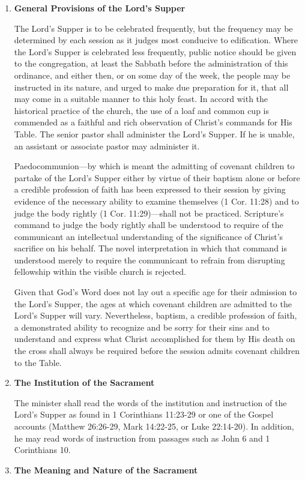 \documentclass[
]{book}
\begin{document}
\begin{enumerate}
\def\labelenumi{\arabic{enumi}.}
\item
  \protect\hypertarget{61}{\href{}{}}\textbf{General Provisions of the Lord's Supper}

  The Lord's Supper is to be celebrated frequently, but the frequency may be determined by each session as it judges most conducive to edification. Where the Lord's Supper is celebrated less frequently, public notice should be given to the congregation, at least the Sabbath before the administration of this ordinance, and either then, or on some day of the week, the people may be instructed in its nature, and urged to make due preparation for it, that all may come in a suitable manner to this holy feast. In accord with the historical practice of the church, the use of a loaf and common cup is commended as a faithful and rich observation of Christ's commands for His Table. The senior pastor shall administer the Lord's Supper. If he is unable, an assistant or associate pastor may administer it.

  Paedocommunion---by which is meant the admitting of covenant children to partake of the Lord's Supper either by virtue of their baptism alone or before a credible profession of faith has been expressed to their session by giving evidence of the necessary ability to examine themselves (1 Cor. 11:28) and to judge the body rightly (1 Cor. 11:29)---shall not be practiced. Scripture's command to judge the body rightly shall be understood to require of the communicant an intellectual understanding of the significance of Christ's sacrifice on his behalf. The novel interpretation in which that command is understood merely to require the communicant to refrain from disrupting fellowship within the visible church is rejected.

  Given that God's Word does not lay out a specific age for their admission to the Lord's Supper, the ages at which covenant children are admitted to the Lord's Supper will vary. Nevertheless, baptism, a credible profession of faith, a demonstrated ability to recognize and be sorry for their sins and to understand and express what Christ accomplished for them by His death on the cross shall always be required before the session admits covenant children to the Table.
\item
  \textbf{The Institution of the Sacrament}

  The minister shall read the words of the institution and instruction of the Lord's Supper as found in 1 Corinthians 11:23-29 or one of the Gospel accounts (Matthew 26:26-29, Mark 14:22-25, or Luke 22:14-20). In addition, he may read words of instruction from passages such as John 6 and 1 Corinthians 10.
\item
  \textbf{The Meaning and Nature of the Sacrament}


\end{enumerate}
\end{document}
